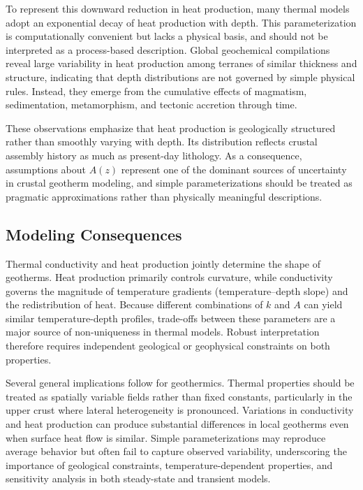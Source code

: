 To represent this downward reduction in heat production, many thermal models adopt an exponential decay of heat production with depth. This parameterization is computationally convenient but lacks a physical basis, and should not be interpreted as a process-based description. Global geochemical compilations reveal large variability in heat production among terranes of similar thickness and structure, indicating that depth distributions are not governed by simple physical rules. Instead, they emerge from the cumulative effects of magmatism, sedimentation, metamorphism, and tectonic accretion through time.

These observations emphasize that heat production is geologically structured rather than smoothly varying with depth. Its distribution reflects crustal assembly history as much as present-day lithology. As a consequence, assumptions about $A(z)$ represent one of the dominant sources of uncertainty in crustal geotherm modeling, and simple parameterizations should be treated as pragmatic approximations rather than physically meaningful descriptions.

\subsection{Modeling Consequences}

Thermal conductivity and heat production jointly determine the shape of geotherms. Heat production primarily controls curvature, while conductivity governs the magnitude of temperature gradients (temperature--depth slope) and the redistribution of heat. Because different combinations of $k$ and $A$ can yield similar temperature-depth profiles, trade-offs between these parameters are a major source of non-uniqueness in thermal models. Robust interpretation therefore requires independent geological or geophysical constraints on both properties.

Several general implications follow for geothermics. Thermal properties should be treated as spatially variable fields rather than fixed constants, particularly in the upper crust where lateral heterogeneity is pronounced. Variations in conductivity and heat production can produce substantial differences in local geotherms even when surface heat flow is similar. Simple parameterizations may reproduce average behavior but often fail to capture observed variability, underscoring the importance of geological constraints, temperature-dependent properties, and sensitivity analysis in both steady-state and transient models.

